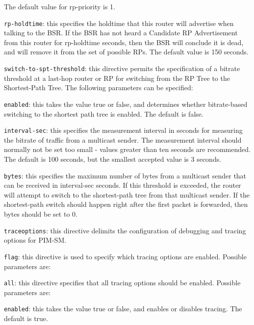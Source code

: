 \begin{description}
\begin{description}
\begin{description}
  The default value for {\stt rp-priority} is 1.
\item{\tt rp-holdtime}: this specifies the holdtime that this router
  will advertise when talking to the BSR.  If the BSR has not heard a
  Candidate RP Advertisement from this router for {\stt rp-holdtime}
  seconds, then the BSR will conclude it is dead, and will remove it
  from the set of possible RPs.  The default value is 150 seconds.
\end{description}
\end{description}
\item{\tt switch-to-spt-threshold}: this directive permits the
  specification of a bitrate threshold at a last-hop router or RP
  for switching from the RP Tree to the Shortest-Path Tree.  The
  following parameters can be specified:
\begin{description}
\item{\tt enabled}: this takes the value {\stt true} or {\stt false},
  and determines whether bitrate-based switching to the shortest
  path tree is enabled.  The default is false.
\item{\tt interval-sec}: this specifies the measurement interval in
  seconds for measuring the bitrate of traffic from a  multicast
  sender.  The measurement interval should normally not be set too
  small - values greater than ten seconds are recommended.  The
  default is 100 seconds, but the smallest accepted value is 3 seconds.
\item{\tt bytes}: this specifies the maximum number of bytes from a
  multicast sender that can be received in {\stt interval-sec}
  seconds.  If this threshold is exceeded, the router will attempt to
  switch to the shortest-path tree from that multicast sender.
  If the shortest-path switch should happen right after the first packet
  is forwarded, then {\stt bytes} should be set to 0.
\end{description}
\item{\tt traceoptions}: this directive delimits the configuration of
  debugging and tracing options for PIM-SM.
\begin{description}
\item{\tt flag}: this directive is used to specify which tracing
  options are enabled.  Possible parameters are:
\begin{description}
\item{\tt all}: this directive specifies that all tracing
  options should be enabled.  Possible parameters are:
\begin{description}
\item{\tt enabled}: this takes the value {\stt true} or {\stt false},
  and enables or disables tracing. The default is {\stt true}.
\end{description}
\end{description}
\end{description}
\end{description}

